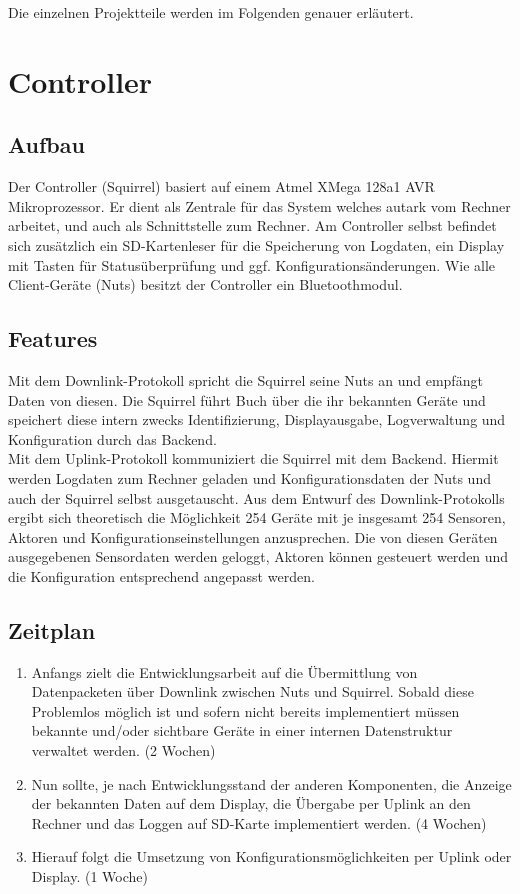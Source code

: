 \documentclass[12pt,a4paper]{article}
\begin{document}
Die einzelnen Projektteile werden im Folgenden genauer erläutert.

\section{Controller}

\subsection{Aufbau}

Der Controller (Squirrel) basiert auf einem Atmel XMega 128a1 AVR Mikroprozessor.
Er dient als Zentrale für das System welches autark vom Rechner arbeitet, und auch als Schnittstelle zum Rechner.
Am Controller selbst befindet sich zusätzlich ein SD-Kartenleser für die Speicherung von Logdaten, ein Display mit Tasten für Statusüberprüfung und ggf. Konfigurationsänderungen.
Wie alle Client-Geräte (Nuts) besitzt der Controller ein Bluetoothmodul.\\

\subsection{Features}
Mit dem Downlink-Protokoll spricht die Squirrel seine Nuts an und empfängt Daten von diesen. Die Squirrel führt Buch über die ihr bekannten Geräte und speichert diese intern zwecks Identifizierung, Displayausgabe, Logverwaltung und Konfiguration durch das Backend.\\
Mit dem Uplink-Protokoll kommuniziert die Squirrel mit dem Backend. Hiermit werden Logdaten zum Rechner geladen und Konfigurationsdaten der Nuts und auch der Squirrel selbst ausgetauscht.
Aus dem Entwurf des Downlink-Protokolls ergibt sich theoretisch die Möglichkeit 254 Geräte mit je insgesamt 254 Sensoren, Aktoren und Konfigurationseinstellungen anzusprechen. Die von diesen Geräten ausgegebenen Sensordaten werden geloggt, Aktoren können gesteuert werden und die Konfiguration entsprechend angepasst werden.

\subsection{Zeitplan}
\begin{enumerate}
	\item Anfangs zielt die Entwicklungsarbeit auf die Übermittlung von Datenpacketen über Downlink zwischen Nuts und Squirrel. Sobald diese Problemlos möglich ist und sofern nicht bereits implementiert müssen bekannte und/oder sichtbare Geräte in einer internen Datenstruktur verwaltet werden. (2 Wochen)
	\item Nun sollte, je nach Entwicklungsstand der anderen Komponenten, die Anzeige der bekannten Daten auf dem Display, die Übergabe per Uplink an den Rechner und das Loggen auf SD-Karte implementiert werden. (4 Wochen)
	\item Hierauf folgt die Umsetzung von Konfigurationsmöglichkeiten per Uplink oder Display. (1 Woche)
\end{enumerate}
\end{document}
